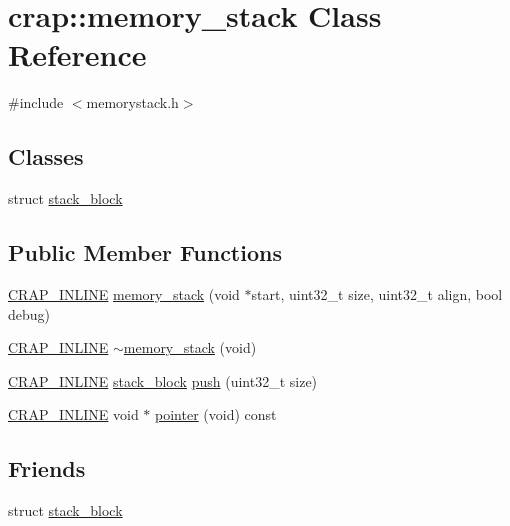 \hypertarget{classcrap_1_1memory__stack}{\section{crap\+:\+:memory\+\_\+stack Class Reference}
\label{classcrap_1_1memory__stack}
}


{\ttfamily \#include $<$memorystack.\+h$>$}

\subsection*{Classes}
\begin{DoxyCompactItemize}
\item 
struct \hyperlink{structcrap_1_1memory__stack_1_1stack__block}{stack\+\_\+block}
\end{DoxyCompactItemize}
\subsection*{Public Member Functions}
\begin{DoxyCompactItemize}
\item 
\hyperlink{config__x86_8h_a5a40526b8d842e7ff731509998bb0f1c}{C\+R\+A\+P\+\_\+\+I\+N\+L\+I\+N\+E} \hyperlink{classcrap_1_1memory__stack_a9689f0764e1451db5e1f1c6310d00c64}{memory\+\_\+stack} (void $\ast$start, uint32\+\_\+t size, uint32\+\_\+t align, bool debug)
\item 
\hyperlink{config__x86_8h_a5a40526b8d842e7ff731509998bb0f1c}{C\+R\+A\+P\+\_\+\+I\+N\+L\+I\+N\+E} \hyperlink{classcrap_1_1memory__stack_ac8ba25515e97c6149f3b1d60927e6acd}{$\sim$memory\+\_\+stack} (void)
\item 
\hyperlink{config__x86_8h_a5a40526b8d842e7ff731509998bb0f1c}{C\+R\+A\+P\+\_\+\+I\+N\+L\+I\+N\+E} \hyperlink{structcrap_1_1memory__stack_1_1stack__block}{stack\+\_\+block} \hyperlink{classcrap_1_1memory__stack_ac657c7de8dee6ee5027e81e755d8dc67}{push} (uint32\+\_\+t size)
\item 
\hyperlink{config__x86_8h_a5a40526b8d842e7ff731509998bb0f1c}{C\+R\+A\+P\+\_\+\+I\+N\+L\+I\+N\+E} void $\ast$ \hyperlink{classcrap_1_1memory__stack_ac2f427387d34f0d32d99e89f19a3e031}{pointer} (void) const 
\end{DoxyCompactItemize}
\subsection*{Friends}
\begin{DoxyCompactItemize}
\item 
struct \hyperlink{classcrap_1_1memory__stack_abdb549c24c617910dfa86bc8d8412eb3}{stack\+\_\+block}
\end{DoxyCompactItemize}


